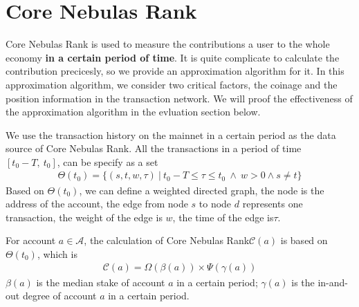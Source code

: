 \section{Core Nebulas Rank}

Core Nebulas Rank is used to measure the contributions a user to the whole economy {\textbf{in a certain period of time}}.
It is quite complicate to calculate the contribution precicesly, so we provide an approximation algorithm for it.
In this approximation algorithm, we consider two critical factors, the coinage and the position information in the transaction network. We will proof the effectiveness of the approximation algorithm in the evluation section below.

We use the transaction history on the mainnet in a certain period as the data source of Core Nebulas Rank.
All the transactions in a period of time $[t_0-T,\ t_0]$, can be specify as a set
\begin{align}
\Theta(t_0) = \{(s, t, w, \tau)\ |\ t_0 - T \le \tau \le t_0\ \land \ w > 0 \land s \neq t \}
\end{align}
\noindent Based on $\Theta(t_0)$, we can define a weighted directed graph, the node is the address of the account, the edge from node $s$ to node $d$ represents one transaction,
the weight of the edge is $w$, the time of the edge is$\tau$.

For account $a \in \mathcal{A}$, the calculation of Core Nebulas Rank$\mathcal{C}(a)$ is based on $\Theta(t_0)$, which is
\begin{align}
\mathcal{C}(a) = \Omega(\beta(a)) \times{} \Psi(\gamma(a))
\label{eq:rank}
\end{align}
\noindent $\beta(a)$ is the median stake of account $a$ in a certain period; $\gamma(a)$ is the in-and-out degree of account $a$ in a certain period.


